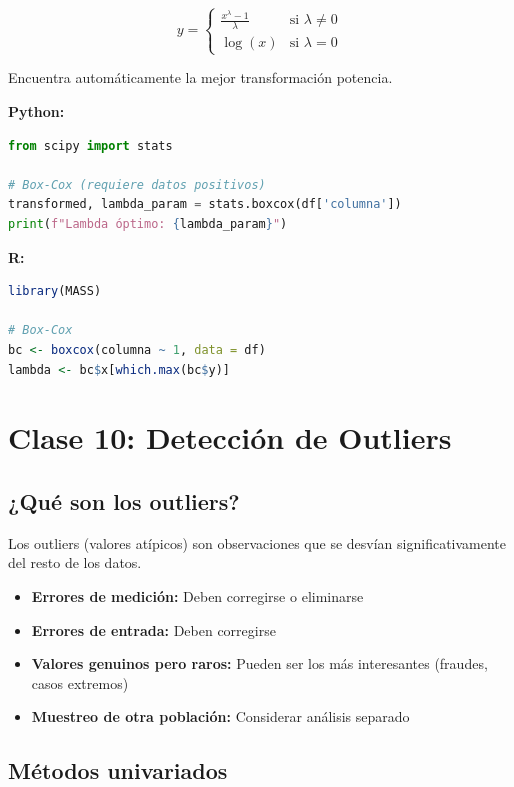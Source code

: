 \documentclass[a4paper,11pt]{article}
\begin{document}
$$y = \begin{cases}
\frac{x^\lambda - 1}{\lambda} & \text{si } \lambda \neq 0\\
\log(x) & \text{si } \lambda = 0
\end{cases}$$

Encuentra automáticamente la mejor transformación potencia.

\textbf{Python:}
\begin{lstlisting}[language=Python]
from scipy import stats

# Box-Cox (requiere datos positivos)
transformed, lambda_param = stats.boxcox(df['columna'])
print(f"Lambda óptimo: {lambda_param}")
\end{lstlisting}

\textbf{R:}
\begin{lstlisting}[language=R]
library(MASS)

# Box-Cox
bc <- boxcox(columna ~ 1, data = df)
lambda <- bc$x[which.max(bc$y)]
\end{lstlisting}

\section{Clase 10: Detección de Outliers}

\subsection{¿Qué son los outliers?}

Los outliers (valores atípicos) son observaciones que se desvían significativamente del resto de los datos.

\begin{tcolorbox}[colback=ejemplocolor!20, colframe=unidadcolor, title=Tipos de outliers]
\begin{itemize}
    \item \textbf{Errores de medición:} Deben corregirse o eliminarse
    \item \textbf{Errores de entrada:} Deben corregirse
    \item \textbf{Valores genuinos pero raros:} Pueden ser los más interesantes (fraudes, casos extremos)
    \item \textbf{Muestreo de otra población:} Considerar análisis separado
\end{itemize}
\end{tcolorbox}

\subsection{Métodos univariados}
\end{document}
